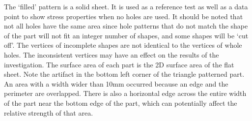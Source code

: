 \documentclass[12pt, letterpaper]{article}
\newcommand{\sorta}[1]{`#1'}
\begin{document}
The \sorta{filled} pattern is a solid sheet. It is used as a reference test as well as a data point to show stress properties when no holes are used. It should be noted that not all holes have the same area since hole patterns that do not match the shape of the part will not fit an integer number of shapes, and some shapes will be \sorta{cut off}. The vertices of incomplete shapes are not identical to the vertices of whole holes. The inconsistent vertices may have an effect on the results of the investigation. The surface area of each part is the 2D surface area of the flat sheet. Note the artifact in the bottom left corner of the triangle patterned part. An area with a width wider than 10mm occurred because an edge and the perimeter are overlapped. There is also a horizontal edge across the entire width of the part near the bottom edge of the part, which can potentially affect the relative strength of that area. 
\end{document}

